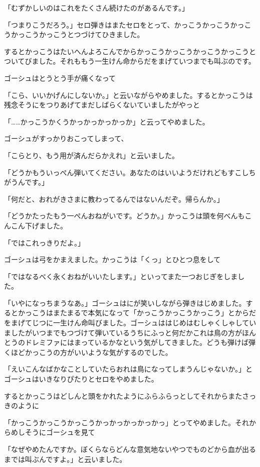 \documentclass[uplatex,a5paper,twoside]{jsarticle}
\begin{document}
「むずかしいのはこれをたくさん続けたのがあるんです。」

「つまりこうだろう。」セロ弾きはまたセロをとって、かっこうかっこうかっこうかっこうかっこうとつづけてひきました。

するとかっこうはたいへんよろこんでからかっこうかっこうかっこうかっこうとついてびました。それももう一生けん命からだをまげていつまでも叫ぶのです。

ゴーシュはとうとう手が痛くなって

「こら、いいかげんにしないか。」と云いながらやめました。するとかっこうは残念そうにをつりあげてまだしばらくないていましたがやっと

「……かっこうかくうかっかっかっかっか」と云ってやめました。

ゴーシュがすっかりおこってしまって、

「こらとり、もう用が済んだらかえれ」と云いました。

「どうかもういっぺん弾いてください。あなたのはいいようだけれどもすこしちがうんです。」

「何だと、おれがきさまに教わってるんではないんだぞ。帰らんか。」

「どうかたったもう一ぺんおねがいです。どうか。」かっこうは頭を何べんもこんこん下げました。

「ではこれっきりだよ。」

ゴーシュは弓をかまえました。かっこうは「くっ」とひとつ息をして

「ではなるべく永くおねがいいたします。」といってまた一つおじぎをしました。

「いやになっちまうなあ。」ゴーシュはにが笑いしながら弾きはじめました。するとかっこうはまたまるで本気になって「かっこうかっこうかっこう」とからだをまげてじつに一生けん命叫びました。ゴーシュははじめはむしゃくしゃしていましたがいつまでもつづけて弾いているうちにふっと何だかこれは鳥の方がほんとうのドレミファにはまっているかなという気がしてきました。どうも弾けば弾くほどかっこうの方がいいような気がするのでした。

「えいこんなばかなことしていたらおれは鳥になってしまうんじゃないか。」とゴーシュはいきなりぴたりとセロをやめました。

するとかっこうはどしんと頭をかれたようにふらふらっとしてそれからまたさっきのように

「かっこうかっこうかっこうかっかっかっかっかっ」とってやめました。それからめしそうにゴーシュを見て

「なぜやめたんですか。ぼくらならどんな意気地ないやつでものどから血が出るまでは叫ぶんですよ。」と云いました。
\end{document}
